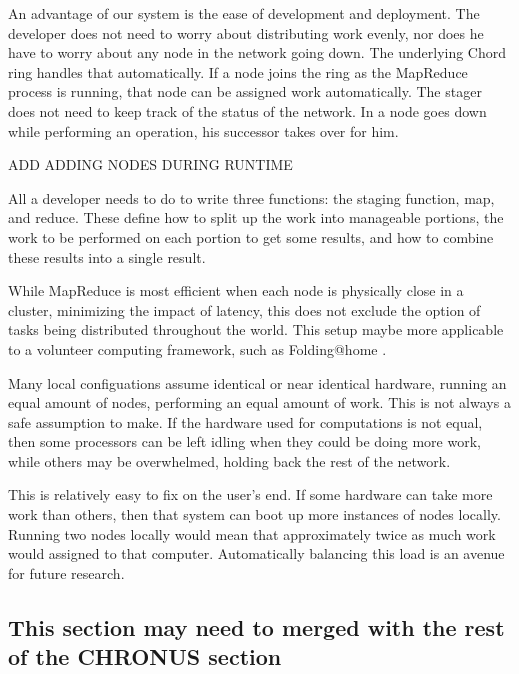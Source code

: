 \documentclass[conference, compsocconf, letterpaper]{IEEEtran}
\begin{document}
An advantage of our system is the ease of development and deployment.  The developer does not need to worry about distributing work evenly, nor does he have to worry about any node in the network going down.  The underlying Chord ring handles that automatically.  If a node joins the ring as the MapReduce process is running, that node can be assigned work automatically.  The stager does not need to keep track of the status of the network.  In a node goes down while performing an operation, his successor takes over for him.

ADD ADDING NODES DURING RUNTIME


All a developer needs to do to write three functions: the staging function, map, and reduce.  These define how to split up the work into manageable portions,  the  work to be performed on each portion to get some results, and how to combine these results into a single result. 

While MapReduce is most efficient when each node is physically close in a cluster, minimizing the impact of latency, this does not exclude the option of tasks being distributed throughout the world.  This setup maybe more applicable to a volunteer computing framework, such as Folding@home \cite{folding}.

Many local configuations assume identical or near identical hardware, running an equal amount of nodes, performing an equal amount of work. This is not always a safe assumption to make.  If the hardware used for computations is not equal, then some processors can be left idling when they could be doing more work, while others may be overwhelmed, holding back the rest of the network.

This is relatively easy to fix on the user's end.  If some hardware can take more work than others, then that system can boot up more instances of nodes locally. Running two nodes locally would mean that approximately twice as much work would assigned to that computer.  Automatically balancing this load is an avenue for future research.




\subsection{This section may need to merged  with the rest of the CHRONUS section}
\end{document}
